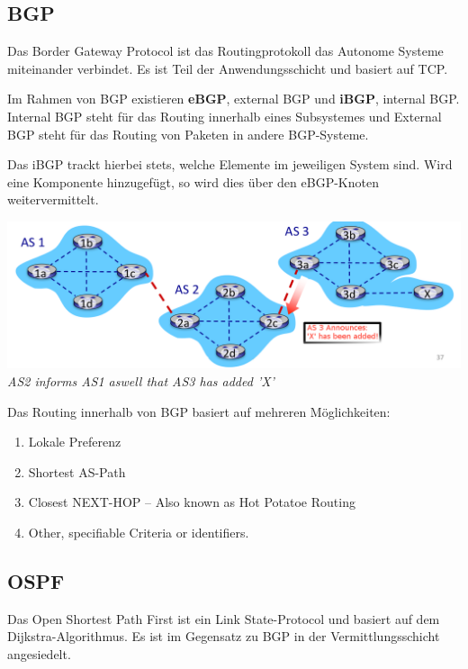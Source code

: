 \documentclass{scrartcl}
\begin{document}
    
    \subsection{BGP}
    Das Border Gateway Protocol ist das Routingprotokoll das Autonome Systeme miteinander verbindet. Es ist Teil der Anwendungsschicht und basiert auf TCP.
    
    Im Rahmen von BGP existieren \textbf{eBGP}, external BGP und \textbf{iBGP}, internal BGP. Internal BGP steht für das Routing innerhalb eines Subsystemes und External BGP steht für das Routing von Paketen in andere BGP-Systeme.
    
    Das iBGP trackt hierbei stets, welche Elemente im jeweiligen System sind. Wird eine Komponente hinzugefügt, so wird dies über den eBGP-Knoten weitervermittelt.
    
    \begin{center}
        \includegraphics[width=\textwidth]{BGP.png}
        \textit{AS2 informs AS1 aswell that AS3 has added 'X'}
    \end{center}
    
    Das Routing innerhalb von BGP basiert auf mehreren Möglichkeiten:
    \begin{enumerate}
        \item Lokale Preferenz
        \item Shortest AS-Path
        \item Closest NEXT-HOP -- Also known as Hot Potatoe Routing
        \item Other, specifiable Criteria or identifiers.
    \end{enumerate}
    
    
    \subsection{OSPF}
    Das Open Shortest Path First ist ein Link State-Protocol und basiert auf dem Dijkstra-Algorithmus. Es ist im Gegensatz zu BGP in der Vermittlungsschicht angesiedelt.
    
\end{document}

